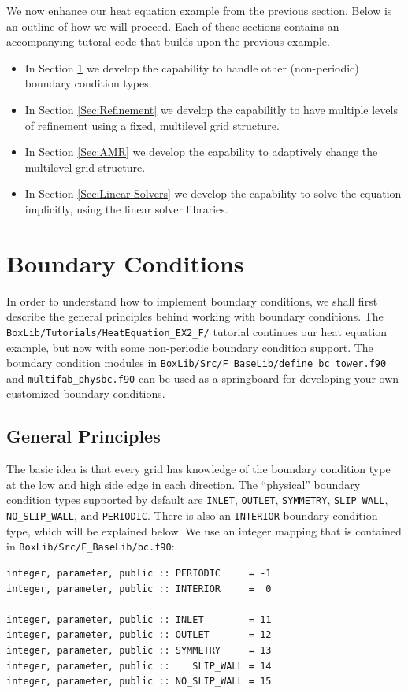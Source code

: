 We now enhance our heat equation example from the previous section.
Below is an outline of how we will proceed.  Each of these sections contains an 
accompanying tutoral code that builds upon the previous example.
\begin{itemize}

\item In Section \ref{Sec:Boundary Conditions} we develop the capability to handle
other (non-periodic) boundary condition types.

\item In Section \ref{Sec:Refinement} we develop the capabilitly to have multiple
levels of refinement using a fixed, multilevel grid structure.

\item In Section \ref{Sec:AMR} we develop the capability to adaptively change the
multilevel grid structure.

\item In Section \ref{Sec:Linear Solvers} we develop the capability to solve the
equation implicitly, using the linear solver libraries.

\end{itemize}

\section{Boundary Conditions}\label{Sec:Boundary Conditions}
In order to understand how to implement boundary conditions, we shall 
first describe the general principles behind working with boundary conditions.
The {\tt BoxLib/Tutorials/HeatEquation\_EX2\_F/} tutorial continues our heat
equation example, but now with some non-periodic boundary condition support.  The boundary
condition modules in {\tt BoxLib/Src/F\_BaseLib/define\_bc\_tower.f90} and {\tt multifab\_physbc.f90} 
can be used as a springboard for developing your own customized boundary conditions.

\subsection{General Principles}
The basic idea is that every grid has knowledge of the
boundary condition type at the low and high side edge in each direction.
The ``physical'' boundary condition types supported by default are {\tt INLET}, {\tt OUTLET},
{\tt SYMMETRY}, {\tt SLIP\_WALL}, {\tt NO\_SLIP\_WALL}, and {\tt PERIODIC}.
There is also an {\tt INTERIOR} boundary condition type, which 
will be explained below.  We use an integer mapping that is 
contained in {\tt BoxLib/Src/F\_BaseLib/bc.f90}:
\begin{lstlisting}[backgroundcolor=\color{light-green}]
integer, parameter, public :: PERIODIC     = -1
integer, parameter, public :: INTERIOR     =  0

integer, parameter, public :: INLET        = 11
integer, parameter, public :: OUTLET       = 12
integer, parameter, public :: SYMMETRY     = 13
integer, parameter, public ::    SLIP_WALL = 14
integer, parameter, public :: NO_SLIP_WALL = 15
\end{lstlisting}

